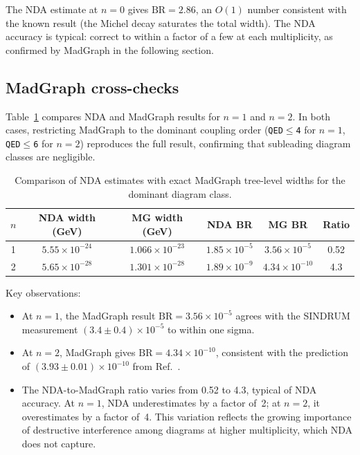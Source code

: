 \documentclass[11pt,a4paper]{article}
\begin{document}
The NDA estimate at $n=0$ gives $\text{BR} = 2.86$, an $O(1)$ number
consistent with the known result (the Michel decay saturates the total
width).
The NDA accuracy is typical: correct to within a factor of a few at each
multiplicity, as confirmed by MadGraph in the following section.


\subsection{MadGraph cross-checks}
\label{sec:madgraph}

Table~\ref{tab:madgraph} compares NDA and MadGraph results for
$n = 1$ and $n = 2$.
In both cases, restricting MadGraph to the dominant coupling order
(\texttt{QED$\leq$4} for $n=1$, \texttt{QED$\leq$6} for $n=2$)
reproduces the full result, confirming that subleading diagram classes
are negligible.

\begin{table}[h]
\centering
\caption{Comparison of NDA estimates with exact MadGraph tree-level
widths for the dominant diagram class.}
\label{tab:madgraph}
\begin{tabular}{cccccc}
\toprule
$n$ & NDA width (GeV) & MG width (GeV) & NDA BR & MG BR & Ratio \\
\midrule
1 & $5.55\times10^{-24}$ & $1.066\times10^{-23}$ & $1.85\times10^{-5}$ & $3.56\times10^{-5}$ & 0.52 \\
2 & $5.65\times10^{-28}$ & $1.301\times10^{-28}$ & $1.89\times10^{-9}$ & $4.34\times10^{-10}$ & 4.3 \\
\bottomrule
\end{tabular}
\end{table}

Key observations:
\begin{itemize}
\item At $n=1$, the MadGraph result
  $\text{BR} = 3.56\times10^{-5}$ agrees with the SINDRUM measurement
  $(3.4 \pm 0.4)\times10^{-5}$ to within one sigma.
\item At $n=2$, MadGraph gives
  $\text{BR} = 4.34\times10^{-10}$, consistent with the prediction
  of $(3.93 \pm 0.01)\times10^{-10}$ from Ref.~\cite{hostert}.
\item The NDA-to-MadGraph ratio varies from 0.52 to 4.3, typical of
  NDA accuracy.
  At $n=1$, NDA underestimates by a factor of~2; at $n=2$, it
  overestimates by a factor of~4.
  This variation reflects the growing importance of destructive
  interference among diagrams at higher multiplicity, which NDA
  does not capture.
\end{itemize}
\end{document}
